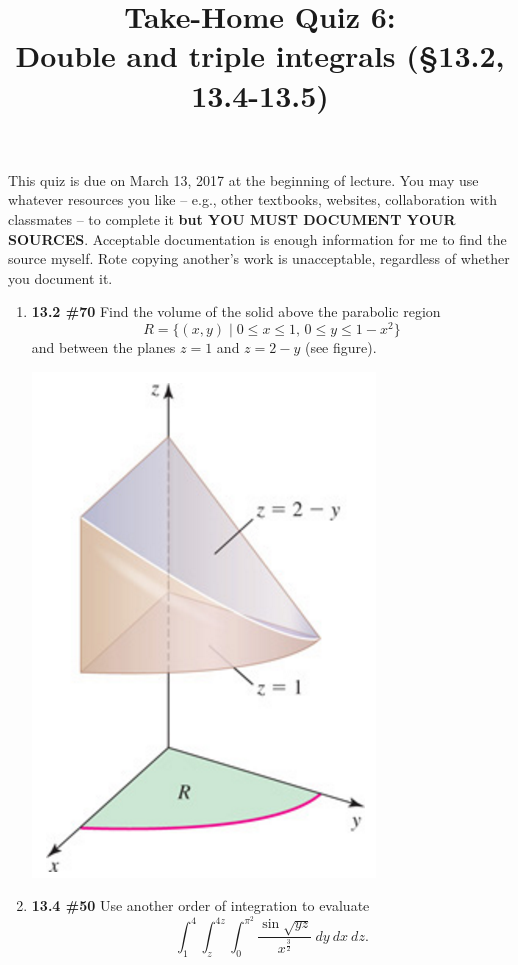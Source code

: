 \documentclass[%
]{article}
\title{\vspace{-3.5pc} 
	\flushleft \bf \Large Take-Home Quiz 6: \\ Double and triple integrals (\S 13.2, 13.4-13.5)}
\date{}
\begin{document}
\maketitle

\vspace{-3pc}
 This quiz is due on March 13, 2017 at the beginning of lecture.  You may use whatever resources you like -- e.g., other textbooks, websites, collaboration with classmates -- to complete it \textbf{but YOU MUST DOCUMENT YOUR SOURCES}.  Acceptable documentation is enough information for me to find the source myself.  Rote copying another's work is unacceptable, regardless of whether you document it.  

\noindent\hrulefill

\begin{enumerate}
\item {\bf 13.2 \#70}
Find the volume of the solid above the parabolic region
\[
R=\{(x,y)\mid 0\leq x\leq 1,\, 0\leq y\leq 1-x^2\}
\]
and between the planes $z=1$ and $z=2-y$ (see figure).

\begin{center}
\includegraphics[scale=0.75]{Q613-2}
\end{center}

\item {\bf 13.4 \#50}
Use another order of integration to evaluate
\[
\int_1^4\int_z^{4z}\int_0^{\pi^2} \frac{\sin{\sqrt{yz}}}{x^{\frac{3}{2}}}\ dy\ dx\ dz.
\]


\end{enumerate}
\end{document}
